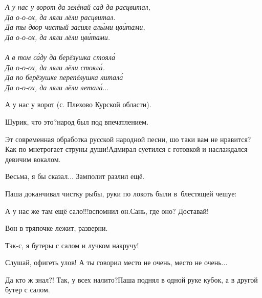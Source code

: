 \vspace{0.2cm}
\noindent\textit{%
	\hspace*{1.5cm}А у нас у ворот да зелёнай сад да расцвитал,\\
	\hspace*{1.5cm}Да о-о-ох, да ляли лёли расцвитал.\\
	\hspace*{1.5cm}Да ты двор чистый засиял ал{\'ы}ми цв{\'и}тами,\\
	\hspace*{1.5cm}Да о-о-ох, да ляли лёли цв{\'и}тами.\\
	\\
	\hspace*{1.5cm}А в том с{\'а}ду да берёзушка стоял{\'а}\\
	\hspace*{1.5cm}Да о-о-ох, да ляли лёли стоял{\'а}.\\
	\hspace*{1.5cm}Да по берёзушке перепёлушка литал{\'а}\\
	\hspace*{1.5cm}Да о-о-ох, да ляли лёли летал{\'а}$\ldots$
}

{\raggedleft \scriptsize \mdash А у нас у ворот (с. Плехово Курской области). \par}

\vspace{0.1cm}

\diagdash Шурик, что это?\mdash народ был под впечатлением.

\diagdash Эт современная обработка русской народной песни, шо таки вам не нравится? Как по мне\mdash трогает струны души!\mdash Адмирал суетился с готовкой и наслаждался девичим вокалом.

\diagdash Весьма, я бы сказал$\ldots$ \mdash Замполит разлил ещё.

Паша доканчивал чистку рыбы, руки по локоть были в~блестящей чешуе:

\diagdash А у нас же там ещё сало!!!\mdash вспомнил он.\mdash Сань, где оно? Доставай!

\diagdash Вон в тряпочке лежит, разверни.

\diagdash Тэк-с, я бутеры с салом и лучком накручу!

\diagdash Слушай, офигеть улов! А ты говорил место не очень, место не очень$\ldots$

\diagdash Да кто ж знал?! Так, у всех налито?\mdash Паша поднял в одной руке кубок, а в другой бутер с салом.

